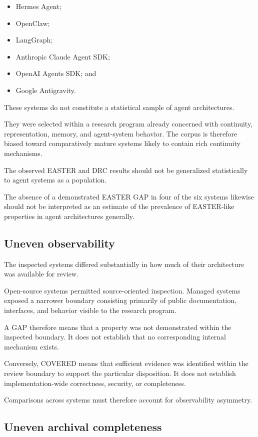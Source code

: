 \documentclass[11pt]{article}
\begin{document}
\begin{itemize}
\item Hermes Agent;
\item OpenClaw;
\item LangGraph;
\item Anthropic Claude Agent SDK;
\item OpenAI Agents SDK; and
\item Google Antigravity.
\end{itemize}

These systems do not constitute a statistical sample of agent architectures.

They were selected within a research program already concerned with continuity, representation, memory, and agent-system behavior. The corpus is therefore biased toward comparatively mature systems likely to contain rich continuity mechanisms.

The observed EASTER and DRC results should not be generalized statistically to agent systems as a population.

The absence of a demonstrated EASTER GAP in four of the six systems likewise should not be interpreted as an estimate of the prevalence of EASTER-like properties in agent architectures generally.

\subsection{Uneven observability}

The inspected systems differed substantially in how much of their architecture was available for review.

Open-source systems permitted source-oriented inspection. Managed systems exposed a narrower boundary consisting primarily of public documentation, interfaces, and behavior visible to the research program.

A GAP therefore means that a property was not demonstrated within the inspected boundary. It does not establish that no corresponding internal mechanism exists.

Conversely, COVERED means that sufficient evidence was identified within the review boundary to support the particular disposition. It does not establish implementation-wide correctness, security, or completeness.

Comparisons across systems must therefore account for observability asymmetry.

\subsection{Uneven archival completeness}
\end{document}
